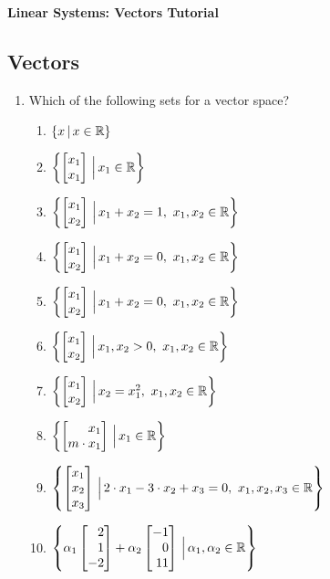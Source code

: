 \documentclass[9pt]{article}
\def\mb{\ensuremath\mathbb}
\def\bmx{\ensuremath\begin{bmatrix*}[r]}
\def\emx{\ensuremath\end{bmatrix*}}
\begin{document}
\begin{center}
\begin{Large}
\textbf{Linear Systems: Vectors Tutorial}
\end{Large}
\end{center}
\vspace{0.2cm}

\begin{multicols}{2}

  \subsection*{Vectors}
  \begin{enumerate}
      \item Which of the following sets for a vector space?
      \begin{enumerate}
        \item $\left\{ x \, \vert \, x \in \mb{R} \right\}$
        \item $\left\{ \bmx x_1 \\ x_1 \emx \, \Big \vert \, x_1 \in \mb{R} \right\}$
        \item $\left\{ \bmx x_1 \\ x_2 \emx \, \Big \vert \, x_1 + x_2 = 1, \,\, x_1, x_2 \in \mb{R}\right\}$
        \item $\left\{ \bmx x_1 \\ x_2 \emx \, \Big \vert \, x_1 + x_2 = 0, \,\, x_1, x_2 \in \mb{R}\right\}$
        \item $\left\{ \bmx x_1 \\ x_2 \emx \, \Big \vert \, x_1 + x_2 = 0, \,\, x_1, x_2 \in \mb{R}\right\}$
        \item $\left\{ \bmx x_1 \\ x_2 \emx \, \Big \vert \, x_1, x_2 > 0, \,\, x_1, x_2 \in \mb{R}\right\}$
        \item $\left\{ \bmx x_1 \\ x_2 \emx \, \Big \vert \, x_2 = x_1^2, \,\, x_1, x_2 \in \mb{R}\right\}$
        \item $\left\{ \bmx x_1 \\ m \cdot x_1 \emx \, \Big \vert \, x_1 \in \mb{R}\right\}$
        \item $\left\{ \bmx x_1 \\ x_2 \\ x_3 \emx \, \Big \vert \, 2 \cdot x_1 - 3 \cdot x_2 + x_3 = 0, \,\, x_1, x_2, x_3 \in \mb{R}\right\}$
        \item $\left\{ \alpha_1 \bmx 2 \\ 1 \\ -2 \emx + \alpha_2 \bmx -1 \\ 0 \\ 11 \emx \, \Big \vert \, \alpha_1, \alpha_2 \in \mb{R}\right\}$
      \end{enumerate}
  \end{enumerate}

\end{multicols}
\end{document}
